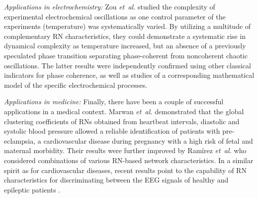 		\emph{Applications in electrochemistry: }
		Zou \textit{et~al.} \cite{Zou2012b} studied the complexity of experimental electrochemical oscillations as one control parameter of the experiments (temperature) was systematically varied. By utilizing a multitude of complementary RN characteristics, they could demonstrate a systematic rise in dynamical complexity as temperature increased, but an absence of a previously speculated phase transition \cite{Wickramasinghe2010} separating phase-coherent from noncoherent chaotic oscillations. The latter results were independently confirmed using other classical indicators for phase coherence, as well as studies of a corresponding mathematical model of the specific electrochemical processes.


		\emph{Applications in medicine: }
		Finally, there have been a couple of successful applications in a medical context. Marwan \textit{et~al.} \cite{Marwan2010c} demonstrated that the global clustering coefficients of RNs obtained from heartbeat intervals, diastolic and systolic blood pressure allowed a reliable identification of patients with pre-eclampsia, a cardiovascular disease during pregnancy with a high risk of fetal and maternal morbidity. Their results were further improved by Ram\'{i}rez \textit{et~al.} \cite{Ramirez2012,Ramirez2013} who considered combinations of various RN-based network characteristics. In a similar spirit as for cardiovascular diseases, recent results point to the capability of RN characteristics for discriminating between the EEG signals of healthy and epileptic patients \cite{Subramaniyam2013}.



